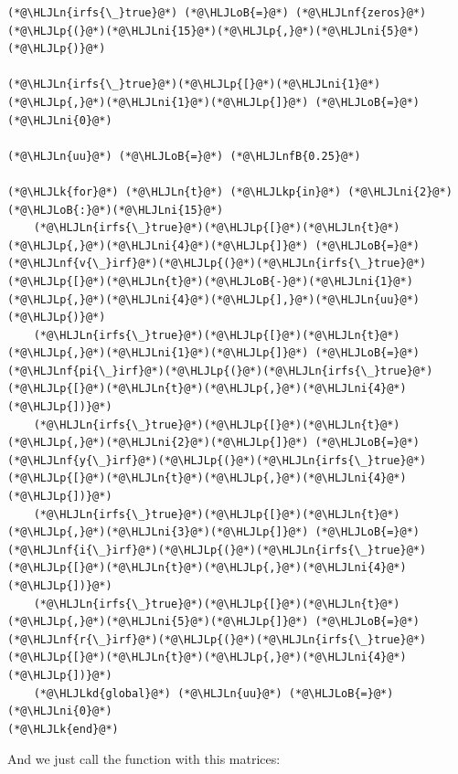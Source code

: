 \documentclass[12pt,a4paper]{article}
\newcommand{\HLJLk}[1]{\textcolor[RGB]{148,91,176}{\textbf{#1}}}
\newcommand{\HLJLkd}[1]{\textcolor[RGB]{214,102,97}{\textit{#1}}}
\newcommand{\HLJLkp}[1]{\textcolor[RGB]{148,91,176}{\textbf{#1}}}
\newcommand{\HLJLn}[1]{#1}
\newcommand{\HLJLnf}[1]{\textcolor[RGB]{66,102,213}{#1}}
\newcommand{\HLJLnfB}[1]{\textcolor[RGB]{59,151,46}{#1}}
\newcommand{\HLJLni}[1]{\textcolor[RGB]{59,151,46}{#1}}
\newcommand{\HLJLoB}[1]{\textcolor[RGB]{102,102,102}{\textbf{#1}}}
\newcommand{\HLJLp}[1]{#1}
\begin{document}
\begin{lstlisting}
(*@\HLJLn{irfs{\_}true}@*) (*@\HLJLoB{=}@*) (*@\HLJLnf{zeros}@*)(*@\HLJLp{(}@*)(*@\HLJLni{15}@*)(*@\HLJLp{,}@*)(*@\HLJLni{5}@*)(*@\HLJLp{)}@*)

(*@\HLJLn{irfs{\_}true}@*)(*@\HLJLp{[}@*)(*@\HLJLni{1}@*)(*@\HLJLp{,}@*)(*@\HLJLni{1}@*)(*@\HLJLp{]}@*) (*@\HLJLoB{=}@*) (*@\HLJLni{0}@*)

(*@\HLJLn{uu}@*) (*@\HLJLoB{=}@*) (*@\HLJLnfB{0.25}@*)

(*@\HLJLk{for}@*) (*@\HLJLn{t}@*) (*@\HLJLkp{in}@*) (*@\HLJLni{2}@*)(*@\HLJLoB{:}@*)(*@\HLJLni{15}@*)
    (*@\HLJLn{irfs{\_}true}@*)(*@\HLJLp{[}@*)(*@\HLJLn{t}@*)(*@\HLJLp{,}@*)(*@\HLJLni{4}@*)(*@\HLJLp{]}@*) (*@\HLJLoB{=}@*) (*@\HLJLnf{v{\_}irf}@*)(*@\HLJLp{(}@*)(*@\HLJLn{irfs{\_}true}@*)(*@\HLJLp{[}@*)(*@\HLJLn{t}@*)(*@\HLJLoB{-}@*)(*@\HLJLni{1}@*)(*@\HLJLp{,}@*)(*@\HLJLni{4}@*)(*@\HLJLp{],}@*)(*@\HLJLn{uu}@*)(*@\HLJLp{)}@*)
    (*@\HLJLn{irfs{\_}true}@*)(*@\HLJLp{[}@*)(*@\HLJLn{t}@*)(*@\HLJLp{,}@*)(*@\HLJLni{1}@*)(*@\HLJLp{]}@*) (*@\HLJLoB{=}@*) (*@\HLJLnf{pi{\_}irf}@*)(*@\HLJLp{(}@*)(*@\HLJLn{irfs{\_}true}@*)(*@\HLJLp{[}@*)(*@\HLJLn{t}@*)(*@\HLJLp{,}@*)(*@\HLJLni{4}@*)(*@\HLJLp{])}@*)
    (*@\HLJLn{irfs{\_}true}@*)(*@\HLJLp{[}@*)(*@\HLJLn{t}@*)(*@\HLJLp{,}@*)(*@\HLJLni{2}@*)(*@\HLJLp{]}@*) (*@\HLJLoB{=}@*) (*@\HLJLnf{y{\_}irf}@*)(*@\HLJLp{(}@*)(*@\HLJLn{irfs{\_}true}@*)(*@\HLJLp{[}@*)(*@\HLJLn{t}@*)(*@\HLJLp{,}@*)(*@\HLJLni{4}@*)(*@\HLJLp{])}@*)
    (*@\HLJLn{irfs{\_}true}@*)(*@\HLJLp{[}@*)(*@\HLJLn{t}@*)(*@\HLJLp{,}@*)(*@\HLJLni{3}@*)(*@\HLJLp{]}@*) (*@\HLJLoB{=}@*) (*@\HLJLnf{i{\_}irf}@*)(*@\HLJLp{(}@*)(*@\HLJLn{irfs{\_}true}@*)(*@\HLJLp{[}@*)(*@\HLJLn{t}@*)(*@\HLJLp{,}@*)(*@\HLJLni{4}@*)(*@\HLJLp{])}@*)
    (*@\HLJLn{irfs{\_}true}@*)(*@\HLJLp{[}@*)(*@\HLJLn{t}@*)(*@\HLJLp{,}@*)(*@\HLJLni{5}@*)(*@\HLJLp{]}@*) (*@\HLJLoB{=}@*) (*@\HLJLnf{r{\_}irf}@*)(*@\HLJLp{(}@*)(*@\HLJLn{irfs{\_}true}@*)(*@\HLJLp{[}@*)(*@\HLJLn{t}@*)(*@\HLJLp{,}@*)(*@\HLJLni{4}@*)(*@\HLJLp{])}@*)
    (*@\HLJLkd{global}@*) (*@\HLJLn{uu}@*) (*@\HLJLoB{=}@*) (*@\HLJLni{0}@*)
(*@\HLJLk{end}@*)
\end{lstlisting}


And we just call the function with this matrices:
\end{document}
